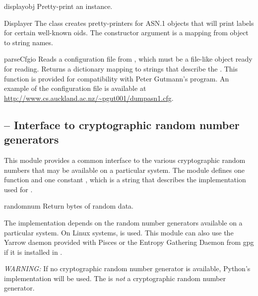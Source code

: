 \documentclass{howto}
\begin{document}
\begin{funcdesc}{display}{obj}
Pretty-print an  instance.
\end{funcdesc}

\begin{classdesc}{Displayer}{}
The  class creates pretty-printers for ASN.1 objects
that will print labels for certain well-known oids.  The constructor
argument  is a mapping from  object to string
names.
\end{classdesc}

\begin{funcdesc}{parseCfg}{io}
Reads a configuration file from , which must be a file-like
object ready for reading.  Returns a dictionary mapping 
to strings that describe the .  This function is provided
for compatibility with Peter Gutmann's  program.  An
example of the configuration file is available at
\url{http://www.cs.auckland.ac.nz/~pgut001/dumpasn1.cfg}.
\end{funcdesc}

\subsection{
	-- Interface to cryptographic random number generators}

This module provides a common interface to the various cryptographic
random numbers that may be available on a particular system.
The module defines one function  and one constant
, which is a string that describes the
implementation used for .

\begin{funcdesc}{random}{num}
Return  bytes of random data.
\end{funcdesc}

The implementation depends on the random number generators available
on a particular system.  On Linux systems,  is
used.  This module can also use the Yarrow daemon provided with Pisces
or the Entropy Gathering Daemon from gpg if it
is installed in .

\emph{WARNING:} If no cryptographic random number generator is
available, Python's  implementation will be used.
The is \emph{not} a cryptographic random number generator.
\end{document}
